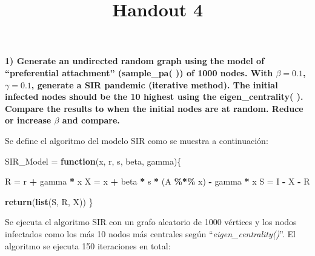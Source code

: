 \documentclass[
]{article}
\title{Handout 4}
\author{}
\date{\vspace{-2.5em}}
\newenvironment{Shaded}{\begin{snugshade}}{\end{snugshade}}
\newcommand{\ControlFlowTok}[1]{\textcolor[rgb]{0.13,0.29,0.53}{\textbf{#1}}}
\newcommand{\KeywordTok}[1]{\textcolor[rgb]{0.13,0.29,0.53}{\textbf{#1}}}
\newcommand{\NormalTok}[1]{#1}
\newcommand{\OperatorTok}[1]{\textcolor[rgb]{0.81,0.36,0.00}{\textbf{#1}}}
\newcommand{\StringTok}[1]{\textcolor[rgb]{0.31,0.60,0.02}{#1}}
\begin{document}
\maketitle

\textbf{1) Generate an undirected random graph using the model of
``preferential attachment'' (sample\_pa( )) of 1000 nodes. With
\(\beta=0.1\), \(\gamma=0.1\), generate a SIR pandemic (iterative
method). The initial infected nodes should be the 10 highest using the
eigen\_centrality( ). Compare the results to when the initial nodes are
at random. Reduce or increase \(\beta\) and compare. }

Se define el algoritmo del modelo SIR como se muestra a continuación:

\begin{Shaded}
\begin{Highlighting}[]
\NormalTok{SIR\_Model =}\StringTok{ }\ControlFlowTok{function}\NormalTok{(x, r, s, beta, gamma)\{}

\NormalTok{  R =}\StringTok{ }\NormalTok{r }\OperatorTok{+}\StringTok{ }\NormalTok{gamma }\OperatorTok{*}\StringTok{ }\NormalTok{x}
\NormalTok{  X =}\StringTok{ }\NormalTok{x }\OperatorTok{+}\StringTok{ }\NormalTok{beta }\OperatorTok{*}\StringTok{ }\NormalTok{s }\OperatorTok{*}\StringTok{ }\NormalTok{(A }\OperatorTok{\%*\%}\StringTok{ }\NormalTok{x) }\OperatorTok{{-}}\StringTok{ }\NormalTok{gamma }\OperatorTok{*}\StringTok{ }\NormalTok{x}
\NormalTok{  S =}\StringTok{ }\NormalTok{I }\OperatorTok{{-}}\StringTok{ }\NormalTok{X }\OperatorTok{{-}}\StringTok{ }\NormalTok{R}

  \KeywordTok{return}\NormalTok{(}\KeywordTok{list}\NormalTok{(S, R, X))}
\NormalTok{\}}
\end{Highlighting}
\end{Shaded}

Se ejecuta el algoritmo SIR con un grafo aleatorio de 1000 vértices y
los nodos infectados como los más 10 nodos más centrales según
``\emph{eigen\_centrality()}''. El algoritmo se ejecuta 150 iteraciones
en total:
\end{document}
